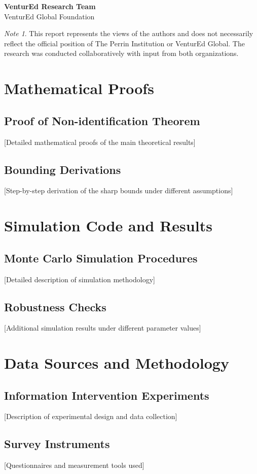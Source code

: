 \documentclass[11pt,letterpaper]{report}
\theoremstyle{definition}
\theoremstyle{remark}
\newtheorem{note}{Note}[chapter]
\begin{document}
\vspace{0.5cm}
\begin{flushright}
\textbf{VenturEd Research Team}\\
VenturEd Global Foundation
\end{flushright}

\begin{note}
This report represents the views of the authors and does not necessarily reflect the official position of The Perrin Institution or VenturEd Global. The research was conducted collaboratively with input from both organizations.
\end{note}



\appendix
\chapter{Mathematical Proofs}
\section{Proof of Non-identification Theorem}
[Detailed mathematical proofs of the main theoretical results]

\section{Bounding Derivations}
[Step-by-step derivation of the sharp bounds under different assumptions]

\chapter{Simulation Code and Results}
\section{Monte Carlo Simulation Procedures}
[Detailed description of simulation methodology]

\section{Robustness Checks}
[Additional simulation results under different parameter values]

\chapter{Data Sources and Methodology}
\section{Information Intervention Experiments}
[Description of experimental design and data collection]

\section{Survey Instruments}
[Questionnaires and measurement tools used]
\end{document}
